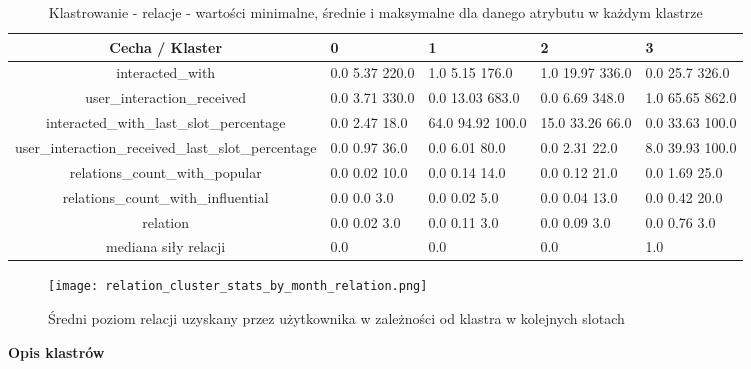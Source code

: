 \documentclass[polish,12pt]{aghthesis}
\begin{document}
\begin{table}[ht]
    \centering
  \begin{center}
\begin{tabular}{ |c|M{1,1cm}|M{1,1cm}|M{1,1cm}|M{1,1cm}| } 
\hline
 Cecha / Klaster & 0 & 1 & 2 & 3 \\ [0.5ex] 
 \hline
interacted\_with & 0.0 5.37 220.0 & 1.0 5.15 176.0 & 1.0 19.97 336.0 & 0.0 25.7 326.0 \\ 
\hline
user\_interaction\_received & 0.0 3.71 330.0 & 0.0 13.03 683.0 & 0.0 6.69 348.0 & 1.0 65.65 862.0 \\ 
\hline
interacted\_with\_last\_slot\_percentage & 0.0 2.47 18.0 & 64.0 94.92 100.0 & 15.0 33.26 66.0 & 0.0 33.63 100.0 \\ 
\hline
user\_interaction\_received\_last\_slot\_percentage & 0.0 0.97 36.0 & 0.0 6.01 80.0 & 0.0 2.31 22.0 & 8.0 39.93 100.0 \\
\hline
relations\_count\_with\_popular & 0.0 0.02 10.0 & 0.0 0.14 14.0 & 0.0 0.12 21.0 & 0.0 1.69 25.0 \\
\hline
relations\_count\_with\_influential & 0.0 0.0 3.0 & 0.0 0.02 5.0 & 0.0 0.04 13.0 & 0.0 0.42 20.0 \\
\hline
\hline
relation & 0.0 0.02 3.0 & 0.0 0.11 3.0 & 0.0 0.09 3.0 & 0.0 0.76 3.0 \\
\hline
mediana siły relacji & 0.0 & 0.0 & 0.0 & 1.0 \\
\hline
\end{tabular}
\end{center}
\caption{Klastrowanie - relacje - wartości minimalne, średnie i maksymalne dla danego atrybutu w każdym klastrze}
\label{tab:r}
\end{table}


\begin{figure}[ht]
    \centering
    \texttt{[image: relation\_cluster\_stats\_by\_month\_relation.png]}
    \caption[Średni poziom relacji uzyskany przez użytkownika w zależności od klastra]{Średni poziom relacji uzyskany przez użytkownika w zależności od klastra w kolejnych slotach}
    \label{fig:relation_stats}
\end{figure}


\FloatBarrier
    


\textbf{Opis klastrów}
\end{document}
